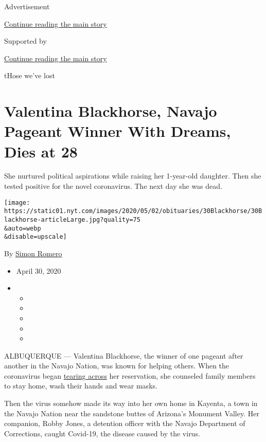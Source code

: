 Advertisement

\protect\hyperlink{after-top}{Continue reading the main story}

Supported by

\protect\hyperlink{after-sponsor}{Continue reading the main story}

tHose we've lost

\hypertarget{valentina-blackhorse-navajo-pageant-winner-with-dreams-dies-at-28}{%
\section{Valentina Blackhorse, Navajo Pageant Winner With Dreams, Dies
at
28}\label{valentina-blackhorse-navajo-pageant-winner-with-dreams-dies-at-28}}

She nurtured political aspirations while raising her 1-year-old
daughter. Then she tested positive for the novel coronavirus. The next
day she was dead.

\texttt{[image: https://static01.nyt.com/images/2020/05/02/obituaries/30Blackhorse/30Blackhorse-articleLarge.jpg?quality=75\\\&auto=webp\\\&disable=upscale]}

By \href{https://www.nytimes.com/by/simon-romero}{Simon Romero}

\begin{itemize}
\item
  April 30, 2020
\item
  \begin{itemize}
  \item
  \item
  \item
  \item
  \item
  \end{itemize}
\end{itemize}

ALBUQUERQUE --- Valentina Blackhorse, the winner of one pageant after
another in the Navajo Nation, was known for helping others. When the
coronavirus began
\href{https://www.nytimes.com/2020/04/09/us/coronavirus-navajo-nation.html}{tearing
across} her reservation, she counseled family members to stay home, wash
their hands and wear masks.

Then the virus somehow made its way into her own home in Kayenta, a town
in the Navajo Nation near the sandstone buttes of Arizona's Monument
Valley. Her companion, Robby Jones, a detention officer with the Navajo
Department of Corrections, caught Covid-19, the disease caused by the
virus.

